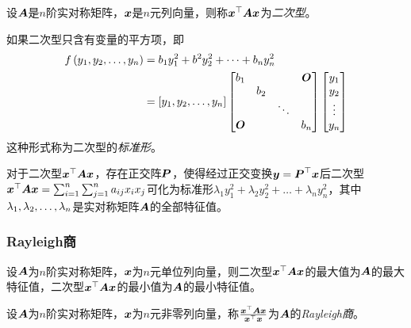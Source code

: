\documentclass{ctexart}
\begin{document}
\begin{definition}[二次型及其标准形]
    设\(\boldsymbol{A}\)是\(n\)阶实对称矩阵，\(\boldsymbol{x}\)是\(n\)元列向量，则称\(\boldsymbol{x}^\top\boldsymbol{A}\boldsymbol{x}\)为\emph{二次型}。

    如果二次型只含有变量的平方项，即
    \begin{align*}
        f\left( {y}_1,{y}_2,\dots,{y}_{n} \right) & =b_1y_1^2+b^2y_2^2+\dots+b_ny_n^2 \\
                              & =\left[ {y}_1,{y}_2,\dots,{y}_{n} \right]
        \begin{bmatrix}
            b_1   &     &        & \boldsymbol{O} \\
                  & b_2 &        &       \\
                  &     & \ddots &       \\
            \boldsymbol{O} &     &        & b_n
        \end{bmatrix}
        \begin{bmatrix}
            y_1 \\y_2\\\vdots\\y_n
        \end{bmatrix}
    \end{align*}
    这种形式称为二次型的\emph{标准形}。
\end{definition}

\begin{theorem}
    对于二次型\(\boldsymbol{x}^\top\boldsymbol{A}\boldsymbol{x}\)，存在正交阵\(\boldsymbol{P}\)，使得经过正交变换\(\boldsymbol{y}=\boldsymbol{P}^\top\boldsymbol{x}\)后二次型\(\boldsymbol{x}^\top\boldsymbol{A}\boldsymbol{x}=\sum_{i=1}^n\sum_{j=1}^na_{ij}x_ix_j\)可化为标准形\(\lambda_1y_1^2+\lambda_2y_2^2+\dots+\lambda_ny_n^2\)，其中\({\lambda}_1,{\lambda}_2,\dots,{\lambda}_{n}\)是实对称矩阵\(\boldsymbol{A}\)的全部特征值。
\end{theorem}

\subsubsection*{Rayleigh商}

\begin{theorem}
    设\(\boldsymbol{A}\)为\(n\)阶实对称矩阵，\(\boldsymbol{x}\)为\(n\)元单位列向量，则二次型\(\boldsymbol{x}^\top\boldsymbol{A}\boldsymbol{x}\)的最大值为\(\boldsymbol{A}\)的最大特征值，二次型\(\boldsymbol{x}^\top\boldsymbol{A}\boldsymbol{x}\)的最小值为\(\boldsymbol{A}\)的最小特征值。
\end{theorem}

\begin{definition}[Rayleigh商]
    设\(\boldsymbol{A}\)为\(n\)阶实对称矩阵，\(\boldsymbol{x}\)为\(n\)元非零列向量，称\(\frac{\boldsymbol{x}^\top\boldsymbol{A}\boldsymbol{x}}{\boldsymbol{x}^\top\boldsymbol{x}}\)为\(\boldsymbol{A}\)的\emph{Rayleigh商}。
\end{definition}
\end{document}

